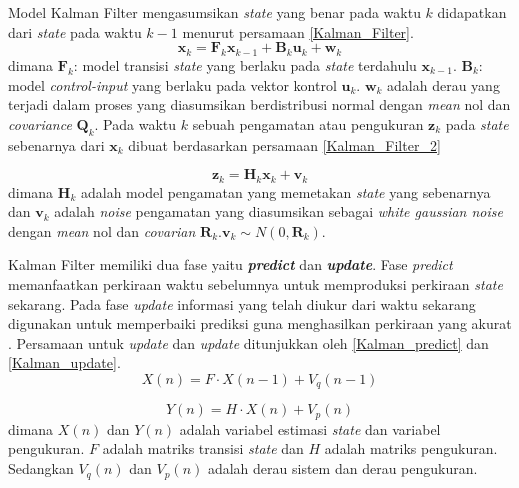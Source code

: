 \documentclass[../thesis.tex]{subfiles}
\begin{document}
Model Kalman Filter mengasumsikan \textit{state} yang benar pada waktu $k$ didapatkan dari \textit{state} pada waktu $k-1$ menurut persamaan \ref{Kalman_Filter}.
\begin{equation} \label{Kalman_Filter}
	\textbf{x}_k = \textbf{F}_{k}\textbf{x}_{k-1} + \textbf{B}_{k}\textbf{u}_k + \textbf{w}_k
\end{equation}
dimana $\textbf{F}_{k}$: model transisi \textit{state} yang berlaku pada \textit{state} terdahulu $\textbf{x}_{k-1}$. $\textbf{B}_{k}$: model \textit{control-input} yang berlaku pada vektor kontrol $\textbf{u}_k$.
$\textbf{w}_k$ adalah derau yang terjadi dalam proses yang diasumsikan berdistribusi normal dengan \textit{mean} nol dan \textit{covariance} $\textbf{Q}_k$. 
Pada waktu $k$ sebuah pengamatan atau pengukuran $\textbf{z}_k$ pada \textit{state} sebenarnya dari $\textbf{x}_k$ dibuat berdasarkan persamaan \ref{Kalman_Filter_2}

\begin{equation} \label{Kalman_Filter_2}
	\textbf{z}_k = \textbf{H}_{k}\textbf{x}_{k} + \textbf{v}_k
\end{equation}
dimana $\textbf{H}_k$ adalah model pengamatan yang memetakan \textit{state} yang sebenarnya dan $\textbf{v}_k$ adalah \textit{noise} pengamatan yang diasumsikan sebagai \textit{white gaussian noise} dengan \textit{mean} nol dan \textit{covarian} $\textbf{R}_k$.$\textbf{v}_k \sim N(0, \textbf{R}_k)$. 

Kalman Filter memiliki dua fase yaitu \textbf{\textit{predict}} dan \textbf{\textit{update}}. Fase \textit{predict} memanfaatkan perkiraan waktu sebelumnya untuk memproduksi perkiraan \textit{state} sekarang.
Pada fase \textit{update} informasi yang telah diukur dari waktu sekarang digunakan untuk memperbaiki prediksi guna menghasilkan perkiraan yang akurat \cite{TrackingKalman}. Persamaan untuk \textit{update} dan \textit{update} ditunjukkan oleh \ref{Kalman_predict} dan \ref{Kalman_update}.
\begin{equation} \label{Kalman_predict}
	X(n) = F \cdot X(n-1) + V_{q}(n-1)	
\end{equation}

\begin{equation} \label{Kalman_update}
	Y(n) = H \cdot X(n) + V_{p}(n)
\end{equation}
dimana $X(n)$ dan $Y(n)$ adalah variabel estimasi \textit{state} dan variabel pengukuran. $F$ adalah matriks transisi \textit{state} dan $H$ adalah matriks pengukuran. Sedangkan $V_{q}(n)$ dan $V_{p}(n)$ adalah derau sistem dan derau pengukuran.
\end{document}
